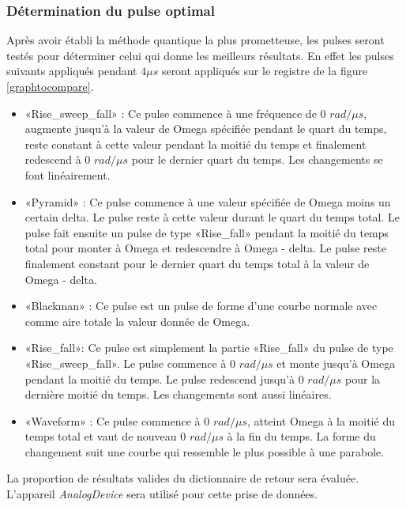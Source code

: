 \documentclass[11pt]{article}
\begin{document}
\subsubsection{Détermination du pulse optimal}\label{pulse_opt}
Après avoir établi la méthode quantique la plus prometteuse, les pulses seront testés pour déterminer celui qui donne les meilleurs résultats. En effet les pulses suivants appliqués pendant $4 \mu s$ seront appliqués sur le registre de la figure \ref{graphtocompare}. 
\begin{itemize}
    \item «Rise\_sweep\_fall» : Ce pulse commence à une fréquence de 0 $rad/\mu s$, augmente jusqu'à la valeur de Omega spécifiée pendant le quart du temps, reste constant à cette valeur pendant la moitié du temps et finalement redescend à 0 $rad/\mu s$ pour le dernier quart du temps. Les changements se font linéairement.

    \item «Pyramid» : Ce pulse commence à une valeur spécifiée de Omega moins un certain delta. Le pulse reste à cette valeur durant le quart du temps total. Le pulse fait ensuite un pulse de type «Rise\_fall» pendant la moitié du temps total pour monter à Omega et redescendre à Omega - delta. Le pulse reste finalement constant pour le dernier quart du temps total à la valeur de Omega - delta.
    
    \item «Blackman» : Ce pulse est un pulse de forme d'une courbe normale avec comme aire totale la valeur donnée de Omega.

    \item «Rise\_fall»: Ce pulse est simplement la partie «Rise\_fall» du pulse de type «Rise\_sweep\_fall». Le pulse commence à 0 $rad/\mu s$ et monte jusqu'à Omega pendant la moitié du temps. Le pulse redescend jusqu'à 0 $rad/\mu s$ pour la dernière moitié du temps. Les changements sont aussi linéaires. 

    \item «Waveform» : Ce pulse commence à 0 $rad/\mu s$, atteint Omega à la moitié du temps total et vaut de nouveau 0 $rad/\mu s$ à la fin du temps. La forme du changement suit une courbe qui ressemble le plus possible à une parabole.
\end{itemize}



La proportion de résultats valides du dictionnaire de retour sera évaluée. L'appareil \textit{AnalogDevice} sera utilisé pour cette prise de données.
\end{document}
